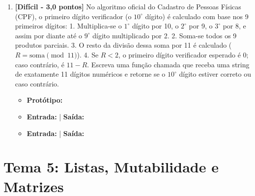 \begin{enumerate}[label=\textbf{Q\arabic*.}, start=39]


\vspace{0.4cm}

\item \textbf{[Difícil - 3,0 pontos]} No algoritmo oficial do Cadastro de Pessoas Físicas (CPF), o primeiro dígito verificador (o $10^\circ$ dígito) é calculado com base nos 9 primeiros dígitos:
1. Multiplica-se o $1^\circ$ dígito por 10, o $2^\circ$ por 9, o $3^\circ$ por 8, e assim por diante até o $9^\circ$ dígito multiplicado por 2.
2. Soma-se todos os 9 produtos parciais.
3. O resto da divisão dessa soma por 11 é calculado ($R = \text{soma} \pmod{11}$).
4. Se $R < 2$, o primeiro dígito verificador esperado é $0$; caso contrário, é $11 - R$.
Escreva uma função chamada  que receba uma string de exatamente 11 dígitos numéricos e retorne  se o $10^\circ$ dígito estiver correto ou  caso contrário.

\begin{itemize}[leftmargin=*]
    \item \textbf{Protótipo:}\newline {}
    \item \textbf{Entrada:}  | \textbf{Saída:} 
    \item \textbf{Entrada:}  | \textbf{Saída:} 
\end{itemize}



\vspace{0.4cm}

\end{enumerate}


\section*{Tema 5: Listas, Mutabilidade e Matrizes}

